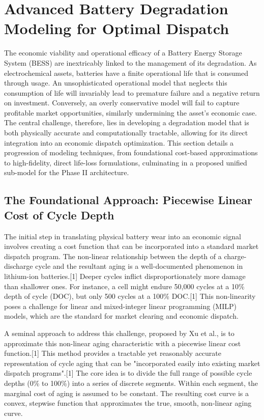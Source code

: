 \section{Advanced Battery Degradation Modeling for Optimal Dispatch}

The economic viability and operational efficacy of a Battery Energy Storage System (BESS) are inextricably linked to the management of its degradation. As electrochemical assets, batteries have a finite operational life that is consumed through usage. An unsophisticated operational model that neglects this consumption of life will invariably lead to premature failure and a negative return on investment. Conversely, an overly conservative model will fail to capture profitable market opportunities, similarly undermining the asset's economic case. The central challenge, therefore, lies in developing a degradation model that is both physically accurate and computationally tractable, allowing for its direct integration into an economic dispatch optimization. This section details a progression of modeling techniques, from foundational cost-based approximations to high-fidelity, direct life-loss formulations, culminating in a proposed unified sub-model for the Phase II architecture.

\subsection{The Foundational Approach: Piecewise Linear Cost of Cycle Depth}

The initial step in translating physical battery wear into an economic signal involves creating a cost function that can be incorporated into a standard market dispatch program. The non-linear relationship between the depth of a charge-discharge cycle and the resultant aging is a well-documented phenomenon in lithium-ion batteries.[1] Deeper cycles inflict disproportionately more damage than shallower ones. For instance, a cell might endure 50,000 cycles at a 10\% depth of cycle (DOC), but only 500 cycles at a 100\% DOC.[1] This non-linearity poses a challenge for linear and mixed-integer linear programming (MILP) models, which are the standard for market clearing and economic dispatch.

A seminal approach to address this challenge, proposed by Xu et al., is to approximate this non-linear aging characteristic with a piecewise linear cost function.[1] This method provides a tractable yet reasonably accurate representation of cycle aging that can be "incorporated easily into existing market dispatch programs".[1] The core idea is to divide the full range of possible cycle depths (0\% to 100\%) into a series of discrete segments. Within each segment, the marginal cost of aging is assumed to be constant. The resulting cost curve is a convex, stepwise function that approximates the true, smooth, non-linear aging curve.

